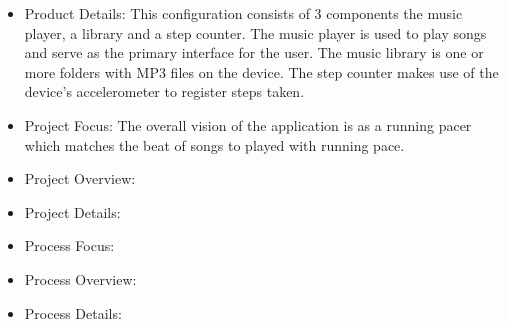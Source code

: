 \begin{itemize}
\item Product Details: This configuration consists of 3 components the music player, a library and a step counter. The music player is used to play songs and serve as the primary interface for the user. The music library is one or more folders with MP3 files on the device. The step counter makes use of the device's accelerometer to register steps taken.
\item Project Focus: The overall vision of the application is as a running pacer which matches the beat of songs to played with running pace.
\item Project Overview: 
\item Project Details: 
\item Process Focus:
\item Process Overview:
\item Process Details:

\end{itemize}
